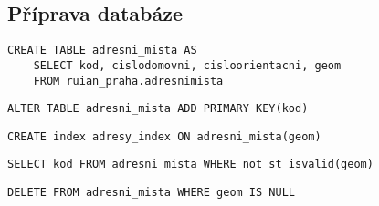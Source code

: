 \documentclass[a4paper, 12pt]{article}
\begin{document}
\subsection{Příprava databáze}

\begin{lstlisting}
CREATE TABLE adresni_mista AS
	SELECT kod, cislodomovni, cisloorientacni, geom
	FROM ruian_praha.adresnimista
\end{lstlisting}

\begin{lstlisting}
ALTER TABLE adresni_mista ADD PRIMARY KEY(kod)
\end{lstlisting}

\begin{lstlisting}
CREATE index adresy_index ON adresni_mista(geom)
\end{lstlisting}

\begin{lstlisting}
SELECT kod FROM adresni_mista WHERE not st_isvalid(geom)
\end{lstlisting}

\begin{lstlisting}
DELETE FROM adresni_mista WHERE geom IS NULL
\end{lstlisting}
\end{document}
